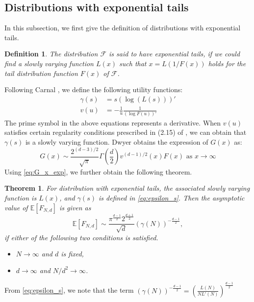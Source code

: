 \documentclass[conference,a4paper]{IEEEtran}
\def\E{\mathbb{E}}
\newtheorem{theorem}{Theorem}
\newtheorem{definition}{Definition}
\begin{document}
\subsection{Distributions with exponential tails}
In this subsection, we first give the definition of distributions with exponential tails.
\begin{definition}
 The distribution $\mathcal{F}$ is said to have exponential tails,
 if we could find
 a slowly varying function $L(x)$ such that
 $x = L(1/F(x))$ holds for the tail distribution function $F(x)$ of $\mathcal{F}$.
\end{definition}
Following Carnal \cite{carnal1970konvexe},
we define the following utility functions:
\begin{align}
     \gamma(s) & = s (\log (L(s)))' \label{eq:epsilon_s}\\
     v(u) &= -\frac{1}{u} \frac{1}{(\log F(u))'}    
\end{align}
The prime symbol in the above equations represents a derivative. When $v(u)$ satisfies
certain regularity conditions prescribed in (2.15) of \cite{carnal1970konvexe},
we can obtain that $\gamma(s)$ is a slowly varying function.
Dwyer \cite{dwyer1991convex} obtains the expression of $G(x)$ as:
\begin{equation}\label{eq:G_x_exp}
     G(x) \sim \frac{2^{(d-3)/2}}{\sqrt{\pi}}\Gamma\left(\frac{d}{2}\right)
     v^{(d-1)/2}(x) F(x)
      \textrm{ as } x\to \infty
\end{equation}
Using \eqref{eq:G_x_exp}, we further obtain the following theorem.
\begin{theorem}\label{thm:exponential_tails}
     For distribution with exponential tails, the associated slowly varying
     function is $L(x)$, and $\gamma(s)$ is defined in \eqref{eq:epsilon_s}. Then
     the asymptotic value of $\E[F_{N,d}]$ is given as
  \begin{equation}\label{eq:exp_e_f_n}
     \E[F_{N,d}]\sim \frac{\pi^{\frac{d-1}{2}} 2^{\frac{d+1}{2}}}{\sqrt{d}} (\gamma(N))^{-\frac{d-1}{2}},
 \end{equation}
 if either of the following two conditions is satisfied.
  \begin{itemize}
     \item $N \to \infty$ and $d$ is fixed,     
     \item  $d\to\infty$ and $N/d^2\to \infty$.
  \end{itemize}
\end{theorem}
 From \eqref{eq:epsilon_s}, we note that the term
 $(\gamma(N))^{-\frac{d-1}{2}}=(\frac{L(N)}{NL'(N)})^{\frac{d-1}{2}}$
\end{document}

